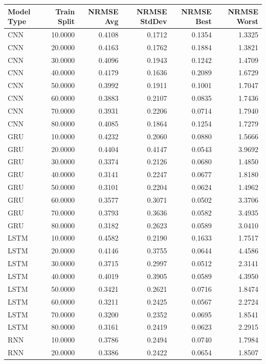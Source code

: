\begin{tabular}{lrrrrr}
\toprule
Model Type & Train Split & NRMSE Avg & NRMSE StdDev & NRMSE Best & NRMSE Worst \\
\midrule
CNN & 10.0000 & 0.4108 & 0.1712 & 0.1354 & 1.3325 \\
CNN & 20.0000 & 0.4163 & 0.1762 & 0.1884 & 1.3821 \\
CNN & 30.0000 & 0.4096 & 0.1943 & 0.1242 & 1.4709 \\
CNN & 40.0000 & 0.4179 & 0.1636 & 0.2089 & 1.6729 \\
CNN & 50.0000 & 0.3992 & 0.1911 & 0.1001 & 1.7047 \\
CNN & 60.0000 & 0.3883 & 0.2107 & 0.0835 & 1.7436 \\
CNN & 70.0000 & 0.3931 & 0.2206 & 0.0714 & 1.7940 \\
CNN & 80.0000 & 0.4085 & 0.1864 & 0.1254 & 1.7279 \\
GRU & 10.0000 & 0.4232 & 0.2060 & 0.0880 & 1.5666 \\
GRU & 20.0000 & 0.4404 & 0.4147 & 0.0543 & 3.9692 \\
GRU & 30.0000 & 0.3374 & 0.2126 & 0.0680 & 1.4850 \\
GRU & 40.0000 & 0.3141 & 0.2247 & 0.0677 & 1.8180 \\
GRU & 50.0000 & 0.3101 & 0.2204 & 0.0624 & 1.4962 \\
GRU & 60.0000 & 0.3577 & 0.3071 & 0.0502 & 3.3706 \\
GRU & 70.0000 & 0.3793 & 0.3636 & 0.0582 & 3.4935 \\
GRU & 80.0000 & 0.3182 & 0.2623 & 0.0589 & 3.0410 \\
LSTM & 10.0000 & 0.4582 & 0.2190 & 0.1633 & 1.7517 \\
LSTM & 20.0000 & 0.4146 & 0.3755 & 0.0644 & 4.4586 \\
LSTM & 30.0000 & 0.3715 & 0.2997 & 0.0512 & 2.3141 \\
LSTM & 40.0000 & 0.4019 & 0.3905 & 0.0589 & 4.3950 \\
LSTM & 50.0000 & 0.3421 & 0.2621 & 0.0716 & 1.8474 \\
LSTM & 60.0000 & 0.3211 & 0.2425 & 0.0567 & 2.2724 \\
LSTM & 70.0000 & 0.3200 & 0.2352 & 0.0695 & 1.8541 \\
LSTM & 80.0000 & 0.3161 & 0.2419 & 0.0623 & 2.2915 \\
RNN & 10.0000 & 0.3786 & 0.2494 & 0.0740 & 1.7984 \\
RNN & 20.0000 & 0.3386 & 0.2422 & 0.0654 & 1.8507 \\

\end{tabular}
